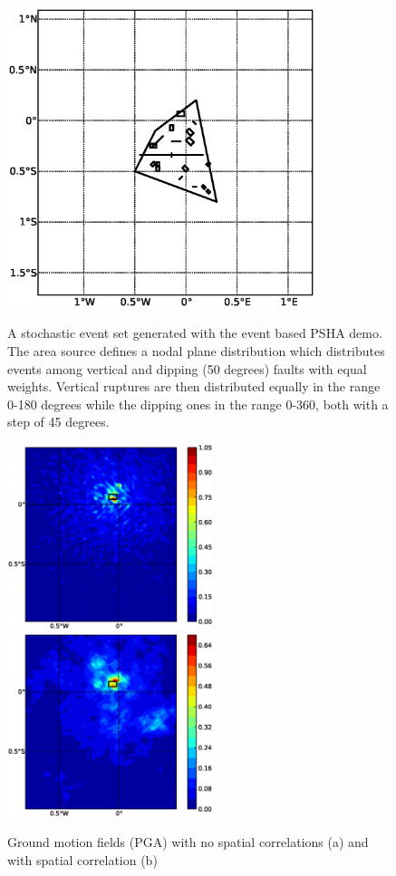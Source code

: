 \begin{figure} 
\centering 
\subcaptionbox{}
{\includegraphics[width=9cm]{./figures/hazard/ses.eps}} 
\caption{A stochastic event set generated with the event based PSHA demo. 
    The area source defines a nodal plane distribution which distributes 
    events among vertical and dipping (50 degrees) faults with equal weights. 
    Vertical ruptures are then distributed equally in the range 0-180 degrees 
    while the dipping ones in the range 0-360, both with a step of 45 degrees.}
\label{fig:ses}
\end{figure}

\begin{figure} 
\centering 
\subcaptionbox{}
{\includegraphics[width=6cm]{./figures/hazard/gmf-no-corr.eps}} 
\subcaptionbox{}
{\includegraphics[width=6cm]{./figures/hazard/gmf-corr.eps}} 
\caption{Ground motion fields (PGA) with no spatial correlations (a) and with spatial correlation (b)}
\label{fig:gmfs}
\end{figure}

